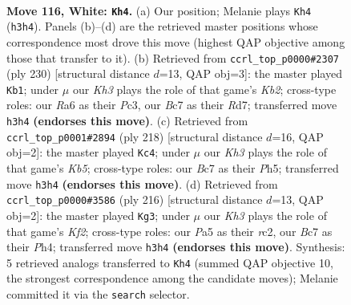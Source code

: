 \documentclass[11pt]{article}
\begin{document}
\clearpage

\begin{figure}[p]\centering
\begin{subfigure}{0.46\textwidth}\centering
\resizebox{\linewidth}{!}{%
\newchessgame
\chessboard[
  setfen={6r1/2B4k/R7/P7/8/7K/8/8 w - - 1 116},
  showmover=false,
  pgfstyle=straightmove, color=movearrow, markmove={h3-h4}
]}
\caption{}
\end{subfigure}\hfill
\begin{subfigure}{0.46\textwidth}\centering
\resizebox{\linewidth}{!}{%
\newchessgame
\chessboard[
  setfen={8/P2R4/r7/1k6/8/2P5/1K6/8 w - - 23 116},
  showmover=false,
  pgfstyle=straightmove, color=movearrow, markmove={b2-b1}
]}
\caption{}
\end{subfigure}
\\[4pt]
\begin{subfigure}{0.46\textwidth}\centering
\resizebox{\linewidth}{!}{%
\newchessgame
\chessboard[
  setfen={1R6/1P4k1/8/1K5P/8/8/1r6/8 w - - 9 110},
  showmover=false,
  pgfstyle=straightmove, color=movearrow, markmove={b5-c4}
]}
\caption{}
\end{subfigure}\hfill
\begin{subfigure}{0.46\textwidth}\centering
\resizebox{\linewidth}{!}{%
\newchessgame
\chessboard[
  setfen={3B4/k7/8/7b/1R5P/8/2r2K2/8 w - - 24 109},
  showmover=false,
  pgfstyle=straightmove, color=movearrow, markmove={f2-g3}
]}
\caption{}
\end{subfigure}
\caption{\textbf{Move 116, White: \texttt{Kh4}.} (a) Our position; Melanie plays \texttt{Kh4} (\texttt{h3h4}). Panels (b)--(d) are the retrieved master positions whose correspondence most drove this move (highest QAP objective among those that transfer to it). (b) Retrieved from \texttt{ccrl\_top\_p0000\#2307} (ply 230) [structural distance $d$=13, QAP obj=3]: the master played \texttt{Kb1}; under $\mu$ our \emph{Kh3} plays the role of that game's \emph{Kb2}; cross-type roles: our \emph{R}a6 as their \emph{P}c3, our \emph{B}c7 as their \emph{R}d7; transferred move \texttt{h3h4} \textbf{(endorses this move)}. (c) Retrieved from \texttt{ccrl\_top\_p0001\#2894} (ply 218) [structural distance $d$=16, QAP obj=2]: the master played \texttt{Kc4}; under $\mu$ our \emph{Kh3} plays the role of that game's \emph{Kb5}; cross-type roles: our \emph{B}c7 as their \emph{P}h5; transferred move \texttt{h3h4} \textbf{(endorses this move)}. (d) Retrieved from \texttt{ccrl\_top\_p0000\#3586} (ply 216) [structural distance $d$=13, QAP obj=2]: the master played \texttt{Kg3}; under $\mu$ our \emph{Kh3} plays the role of that game's \emph{Kf2}; cross-type roles: our \emph{P}a5 as their \emph{r}c2, our \emph{B}c7 as their \emph{P}h4; transferred move \texttt{h3h4} \textbf{(endorses this move)}. Synthesis: 5 retrieved analogs transferred to \texttt{Kh4} (summed QAP objective 10, the strongest correspondence among the candidate moves); Melanie committed it via the \texttt{search} selector.}
\label{fig:thought-m230}
\end{figure}
\end{document}
